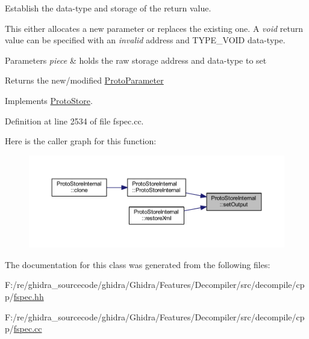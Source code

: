 Establish the data-\/type and storage of the return value. 

This either allocates a new parameter or replaces the existing one. A {\itshape void} return value can be specified with an {\itshape invalid} address and T\+Y\+P\+E\+\_\+\+V\+O\+ID data-\/type. 
\begin{DoxyParams}{Parameters}
{\em piece} & holds the raw storage address and data-\/type to set \\
\hline
\end{DoxyParams}
\begin{DoxyReturn}{Returns}
the new/modified \mbox{\hyperlink{class_proto_parameter}{Proto\+Parameter}} 
\end{DoxyReturn}


Implements \mbox{\hyperlink{class_proto_store_a51a4d28fac8dc3ba5037190ed0cc0edc}{Proto\+Store}}.



Definition at line 2534 of file fspec.\+cc.

Here is the caller graph for this function\+:
\nopagebreak
\begin{figure}[H]
\begin{center}
\leavevmode
\includegraphics[width=350pt]{class_proto_store_internal_a9dfb7feca9c49b33e9857740e7ea9a9a_icgraph}
\end{center}
\end{figure}


The documentation for this class was generated from the following files\+:\begin{DoxyCompactItemize}
\item 
F\+:/re/ghidra\+\_\+sourcecode/ghidra/\+Ghidra/\+Features/\+Decompiler/src/decompile/cpp/\mbox{\hyperlink{fspec_8hh}{fspec.\+hh}}\item 
F\+:/re/ghidra\+\_\+sourcecode/ghidra/\+Ghidra/\+Features/\+Decompiler/src/decompile/cpp/\mbox{\hyperlink{fspec_8cc}{fspec.\+cc}}\end{DoxyCompactItemize}
